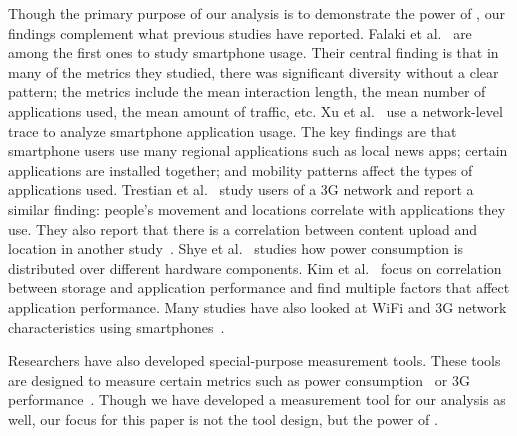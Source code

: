 Though the primary purpose of our analysis is to demonstrate the power of
\PhoneLab{}, our findings complement what previous studies have reported. Falaki
et al.~\cite{falaki:mobisys:2010} are among the first ones to study smartphone
usage. Their central finding is that in many of the metrics they studied, there
was significant diversity without a clear pattern; the metrics include the mean
interaction length, the mean number of applications used, the mean amount of
traffic, etc. Xu et al.~\cite{xu:imc:2011} use a network-level trace to analyze
smartphone application usage. The key findings are that smartphone users use
many regional applications such as local news apps; certain applications are
installed together; and mobility patterns affect the types of applications
used. Trestian et al.~\cite{trestian:imc:2009} study users of a 3G network and
report a similar finding: people's movement and locations correlate with
applications they use. They also report that there is a correlation between
content upload and location in another study~\cite{trestian:ton:2012}. Shye et
al.~\cite{shye:micro:2009} studies how power consumption is distributed over
different hardware components. Kim et al.~\cite{kim:fast:2012} focus on
correlation between storage and application performance and find multiple
factors that affect application performance. Many studies have also looked at
WiFi and 3G network characteristics using
smartphones~\cite{keralapura:mobicom:2010, maier:pam:2010, gember:pam:2011}.

Researchers have also developed special-purpose measurement tools. These tools
are designed to measure certain metrics such as power
consumption~\cite{zhang:codes:2010, pathak:eurosys:2012} or 3G
performance~\cite{huang:mobisys:2010}. Though we have developed a measurement
tool for our analysis as well, our focus for this paper is not the tool design,
but the power of \PhoneLab{}.
